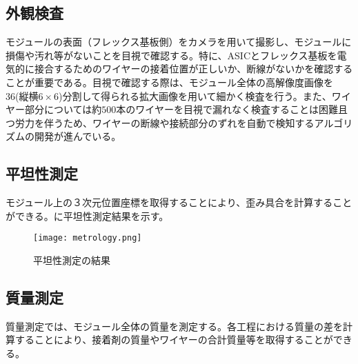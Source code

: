 \subsection{外観検査}
\label{sec:visualinsp}
モジュールの表面（フレックス基板側）をカメラを用いて撮影し、モジュールに損傷や汚れ等がないことを目視で確認する。特に、ASICとフレックス基板を電気的に接合するためのワイヤーの接着位置が正しいか、断線がないかを確認することが重要である。目視で確認する際は、モジュール全体の高解像度画像を36(縦横$6\times6$)分割して得られる拡大画像を用いて細かく検査を行う。また、ワイヤー部分については約$500$本のワイヤーを目視で漏れなく検査することは困難且つ労力を伴うため、ワイヤーの断線や接続部分のずれを自動で検知するアルゴリズムの開発が進んでいる。

\subsection{平坦性測定}
\label{sec:metrology}
モジュール上の３次元位置座標を取得することにより、歪み具合を計算することができる。に平坦性測定結果を示す。

\begin{figure}[tbp]
  \centering
  \texttt{[image: metrology.png]}
  \caption[平坦性測定の結果]{平坦性測定の結果 }
  \label{fig:metrology}
\end{figure}

\subsection{質量測定}
\label{sec:mass}
質量測定では、モジュール全体の質量を測定する。各工程における質量の差を計算することにより、接着剤の質量やワイヤーの合計質量等を取得することができる。

